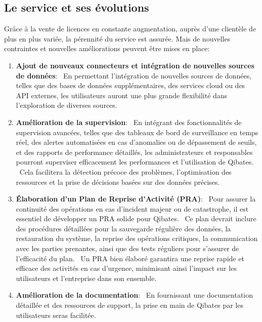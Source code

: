 \documentclass[a4paper, 11pt]{report}
\begin{document}
\subsection{Le service et ses évolutions}
Grâce à la vente de licences en constante augmentation, auprès d’une clientèle de plus en plus variée, la pérennité du service est assurée. Mais de nouvelles contraintes et nouvelles améliorations peuvent être mises en place:
\begin{enumerate}
  \item \textbf{Ajout de nouveaux connecteurs et intégration de nouvelles sources de données}:
    \ En permettant l'intégration de nouvelles sources de données, telles que des bases de données supplémentaires, des services cloud ou des API externes, les utilisateurs auront une plus grande flexibilité dans l'exploration de diverses sources.
  \item \textbf{Amélioration de la supervision}:
    \ En intégrant des fonctionnalités de supervision avancées, telles que des tableaux de bord de surveillance en temps réel, des alertes automatisées en cas d'anomalies ou de dépassement de seuils, et des rapports de performance détaillés, les administrateurs et responsables pourront superviser efficacement les performances et l'utilisation de Qibates.
    \ Cela facilitera la détection précoce des problèmes, l'optimisation des ressources et la prise de décisions basées sur des données précises.
  \item \textbf{Élaboration d'un Plan de Reprise d'Activité (PRA)}:
    \ Pour assurer la continuité des opérations en cas d'incident majeur ou de catastrophe, il est essentiel de développer un PRA solide pour Qibates.
    \ Ce plan devrait inclure des procédures détaillées pour la sauvegarde régulière des données, la restauration du système, la reprise des opérations critiques, la communication avec les parties prenantes, ainsi que des tests réguliers pour s'assurer de l'efficacité du plan.
    \ Un PRA bien élaboré garantira une reprise rapide et efficace des activités en cas d'urgence, minimisant ainsi l'impact sur les utilisateurs et l'entreprise dans son ensemble.
  \item \textbf{Amélioration de la documentation}:
    \ En fournissant une documentation détaillée et des ressources de support, la prise en main de Qibates par les utilisateurs seras facilitée.
\end{enumerate}
\end{document}
